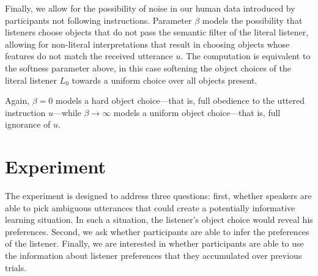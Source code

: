 \documentclass[10pt,a4paper]{article}
\begin{document}


Finally, we allow for the possibility of noise in our human data introduced by participants not following instructions.
Parameter $\beta$ models the possibility that listeners choose objects that do not pass the semantic filter of the literal listener, allowing for non-literal interpretations that result in choosing objects whose features do not match the received utterance $u$. 
The computation is equivalent to the softness parameter above, in this case softening the object choices of the literal listener $L_0$ towards a uniform choice over all objects present. 

Again, $\beta=0$ models a hard object choice---that is, full obedience to the uttered instruction $u$---while $\beta \rightarrow \infty$ models a uniform object choice---that is, full ignorance of $u$.

\section{Experiment}

The experiment is designed to address three questions: first, whether speakers are able to pick ambiguous utterances that could create a potentially informative learning situation. In such a situation, the listener's object choice would reveal his preferences. Second, we ask whether participants are able to infer the preferences of the listener. Finally, we are interested in whether participants are able to use the information about listener preferences that they accumulated over previous trials.
\end{document}

